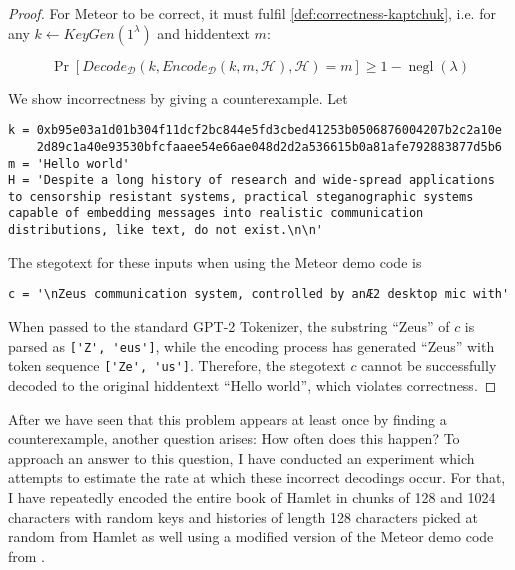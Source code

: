 \begin{proof}
For Meteor to be correct, it must fulfil \autoref{def:correctness-kaptchuk}, i.e. for any $k \leftarrow KeyGen(1^\lambda)$ and hiddentext $m$:

$$\mathop{Pr}[Decode_{\mathcal{D}}(k, Encode_{\mathcal{D}}(k, m, \mathcal{H}), \mathcal{H}) = m] \geq 1 - \mathop{negl}(\lambda)$$

We show incorrectness by giving a counterexample. 
Let

\begin{lstlisting}[breaklines]
k = 0xb95e03a1d01b304f11dcf2bc844e5fd3cbed41253b0506876004207b2c2a10e
    2d89c1a40e93530bfcfaaee54e66ae048d2d2a536615b0a81afe792883877d5b6
m = 'Hello world'
H = 'Despite a long history of research and wide-spread applications to censorship resistant systems, practical steganographic systems capable of embedding messages into realistic communication distributions, like text, do not exist.\n\n'
\end{lstlisting}

The stegotext for these inputs when using the Meteor demo code is

\begin{lstlisting}
c = '\nZeus communication system, controlled by anÆ2 desktop mic with'
\end{lstlisting}

When passed to the standard GPT-2 Tokenizer, the substring ``Zeus'' of $c$ is parsed as \lstinline{['Z', 'eus']}, while the encoding process has generated ``Zeus'' with token sequence \lstinline{['Ze', 'us']}.
Therefore, the stegotext $c$ cannot be successfully decoded to the original hiddentext ``Hello world'', which violates correctness.
\end{proof}

After we have seen that this problem appears at least once by finding a counterexample, another question arises:
How often does this happen?
To approach an answer to this question, I have conducted an experiment which attempts to estimate the rate at which these incorrect decodings occur.
For that, I have repeatedly encoded the entire book of Hamlet in chunks of 128 and 1024 characters with random keys and histories of length 128 characters picked at random from Hamlet as well using a modified version of the Meteor demo code from \cite{MeteorDemo2021}.

